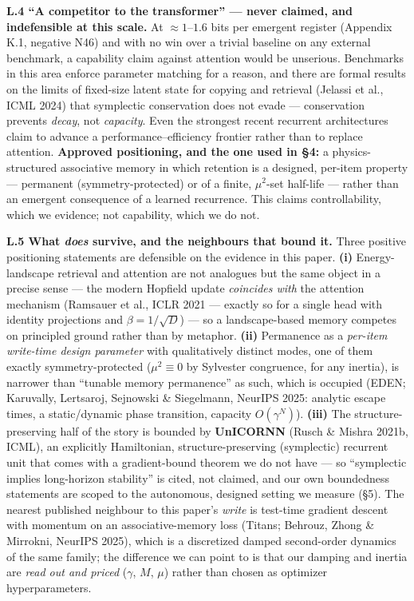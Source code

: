 \documentclass[10pt]{article}
\begin{document}
\textbf{L.4 ``A competitor to the transformer'' --- never claimed, and indefensible at this scale.} At $\approx1$--$1.6$ bits per emergent register (Appendix K.1, negative N46) and with no win over a trivial baseline on any external benchmark, a capability claim against attention would be unserious. Benchmarks in this area enforce parameter matching for a reason, and there are formal results on the limits of fixed-size latent state for copying and retrieval (Jelassi et al., ICML 2024) that symplectic conservation does not evade --- conservation prevents \emph{decay}, not \emph{capacity}. Even the strongest recent recurrent architectures claim to advance a performance--efficiency frontier rather than to replace attention. \textbf{Approved positioning, and the one used in \S4:} a physics-structured associative memory in which retention is a designed, per-item property --- permanent (symmetry-protected) or of a finite, $\mu^2$-set half-life --- rather than an emergent consequence of a learned recurrence. This claims controllability, which we evidence; not capability, which we do not.

\textbf{L.5 What \emph{does} survive, and the neighbours that bound it.} Three positive positioning statements are defensible on the evidence in this paper. \textbf{(i)} Energy-landscape retrieval and attention are not analogues but the same object in a precise sense --- the modern Hopfield update \emph{coincides with} the attention mechanism (Ramsauer et al., ICLR 2021 --- exactly so for a single head with identity projections and $\beta=1/\sqrt D$) --- so a landscape-based memory competes on principled ground rather than by metaphor. \textbf{(ii)} Permanence as a \emph{per-item write-time design parameter} with qualitatively distinct modes, one of them exactly symmetry-protected ($\mu^2\equiv0$ by Sylvester congruence, for any inertia), is narrower than ``tunable memory permanence'' as such, which is occupied (EDEN; Karuvally, Lertsaroj, Sejnowski \& Siegelmann, NeurIPS 2025: analytic escape times, a static/dynamic phase transition, capacity $O(\gamma^N)$). \textbf{(iii)} The structure-preserving half of the story is bounded by \textbf{UnICORNN} (Rusch \& Mishra 2021b, ICML), an explicitly Hamiltonian, structure-preserving (symplectic) recurrent unit that comes with a gradient-bound theorem we do not have --- so ``symplectic implies long-horizon stability'' is cited, not claimed, and our own boundedness statements are scoped to the autonomous, designed setting we measure (\S5). The nearest published neighbour to this paper's \emph{write} is test-time gradient descent with momentum on an associative-memory loss (Titans; Behrouz, Zhong \& Mirrokni, NeurIPS 2025), which is a discretized damped second-order dynamics of the same family; the difference we can point to is that our damping and inertia are \emph{read out and priced} ($\gamma$, $M$, $\mu$) rather than chosen as optimizer hyperparameters.
\end{document}
